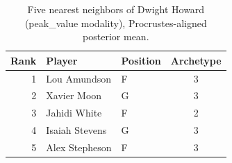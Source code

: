 \begin{table}[htbp]
  \centering\small
  \begin{tabular}{rllc}
    \toprule
    Rank & Player & Position & Archetype \\
    \midrule
    1 & Lou Amundson & F & 3 \\
    2 & Xavier Moon & G & 3 \\
    3 & Jahidi White & F & 2 \\
    4 & Isaiah Stevens & G & 3 \\
    5 & Alex Stepheson & F & 3 \\
    \bottomrule
  \end{tabular}
  \caption{Five nearest neighbors of Dwight Howard (peak_value modality), Procrustes-aligned posterior mean.}
  \label{tab:Dwight_Howard_neighbors_peak_value}
\end{table}

